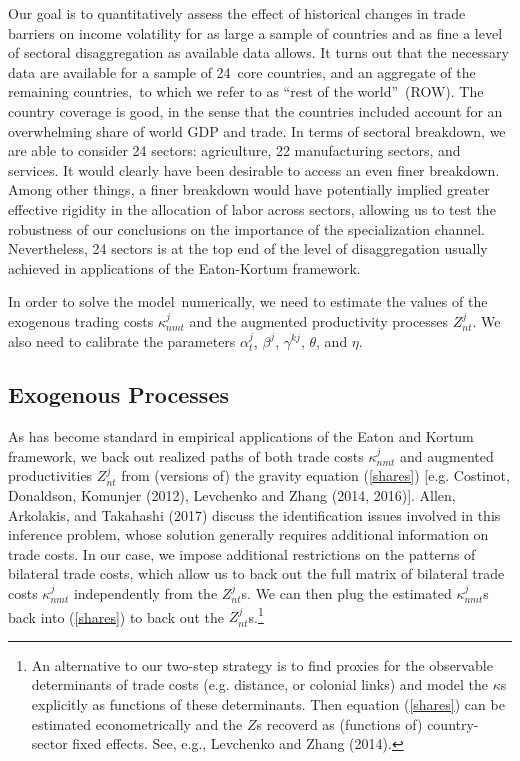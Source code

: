 \documentclass[12pt]{article}
\begin{document}
\label{mapping_into_observables} Our goal is to quantitatively assess the
effect of historical changes in trade barriers on income volatility for as
large a sample of countries and as fine a level of sectoral disaggregation
as available data allows. It turns out that the necessary data are available
for a sample of 24\ core countries, and an aggregate of the remaining
countries,\ to which we refer to as \textquotedblleft rest of the
world\textquotedblright\ (ROW). The country coverage is good, in the sense
that the countries included account for an overwhelming share of world GDP
and trade. In terms of sectoral breakdown, we are able to consider 24
sectors: agriculture, 22 manufacturing sectors, and services. It would
clearly have been desirable to access an even finer breakdown. Among other
things, a finer breakdown would have potentially implied greater effective
rigidity in the allocation of labor across sectors, allowing us to test the
robustness of our conclusions on the importance of the specialization
channel. Nevertheless, 24 sectors is at the top end of the level of
disaggregation usually achieved in applications of the Eaton-Kortum
framework.

In order to solve the model\ numerically, we need to estimate the values of
the exogenous trading costs $\kappa _{nmt}^{j}$ and the augmented
productivity processes $Z_{nt}^{j}$. We also need to calibrate the
parameters $\alpha _{t}^{j}$, $\beta ^{j}$, $\gamma ^{kj}$, $\theta $, and $%
\eta $.

\subsection{Exogenous Processes}

As has become standard in empirical applications of the Eaton and Kortum
framework, we back out realized paths of both trade costs $\kappa _{nmt}^{j}$
and augmented productivities $Z_{nt}^{j}$ from (versions of) the gravity
equation (\ref{shares}) [e.g. Costinot, Donaldson, Komunjer (2012),
Levchenko and Zhang (2014, 2016)]. Allen, Arkolakis, and Takahashi (2017)
discuss the identification issues involved in this inference problem, whose
solution generally requires additional information on trade costs. In our
case, we impose additional restrictions on the patterns of bilateral trade
costs, which allow us to back out the full matrix of bilateral trade costs $%
\kappa _{nmt}^{j}$ independently from the $Z_{nt}^{j}$s. We can then plug
the estimated $\kappa _{nmt}^{j}$s back into (\ref{shares}) to back out the $%
Z_{nt}^{j}$s.\footnote{%
An alternative to our two-step strategy is to find proxies for the
observable determinants of trade costs (e.g. distance, or colonial links)
and model the $\kappa $s explicitly as functions of these determinants. Then
equation (\ref{shares}) can be estimated econometrically and the $Z$s
recoverd as (functions of) country-sector fixed effects. See, e.g.,
Levchenko and Zhang (2014).}
\end{document}
